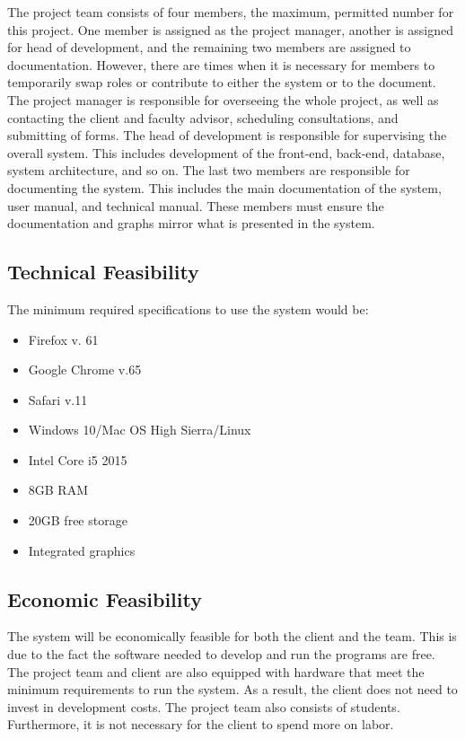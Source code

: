 The project team consists of four members, the maximum, permitted number for this project. One member is assigned as the project manager, another is assigned for head of development, and the remaining two members are assigned to documentation. However, there are times when it is necessary for members to temporarily swap roles or contribute to either the system or to the document. The project manager is responsible for overseeing the whole project, as well as contacting the client and faculty advisor, scheduling consultations, and submitting of forms. The head of development is responsible for supervising the overall system. This includes development of the front-end, back-end, database, system architecture, and so on. The last two members are responsible for documenting the system. This includes the main documentation of the system, user manual, and technical manual. These members must ensure the documentation and graphs mirror what is presented in the system.

\subsection{Technical Feasibility}
The minimum required specifications to use the system would be:
\begin{itemize}
    \item{Firefox v. 61}
    \item{Google Chrome v.65}
    \item{Safari v.11}
    \item{Windows 10/Mac OS High Sierra/Linux}
    \item{Intel Core i5 2015}
    \item{8GB RAM}
    \item{20GB free storage}
    \item{Integrated graphics}
\end{itemize}

\subsection{Economic Feasibility}
The system will be economically feasible for both the client and the team. This is due to the fact the software needed to develop and run the programs are free. The project team and client are also equipped with hardware that meet the minimum requirements to run the system. As a result, the client does not need to invest in development costs. The project team also consists of students. Furthermore, it is not necessary for the client to spend more on labor.